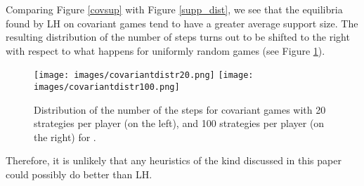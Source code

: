 \documentclass[11pt]{article}
\begin{document}
Comparing Figure \ref{covsup} with Figure \ref{supp_dist}, we see that
the equilibria found by LH
on covariant games tend to have a greater average support size.
The resulting distribution of the number of steps turns out to be
shifted to the right
with respect to what happens for uniformly random games (see Figure
\ref{covdis}).

\begin{figure}[h]
\centering
\texttt{[image: images/covariantdistr20.png]}
\texttt{[image: images/covariantdistr100.png]}
\caption{Distribution of the number of the steps for covariant games
with 20 strategies per
player (on the left), and 100 strategies per player (on the right) for
.}
\label{covdis}
\end{figure}

Therefore, it is unlikely that any heuristics of the kind discussed
in this paper could possibly do better than LH.
\end{document}
